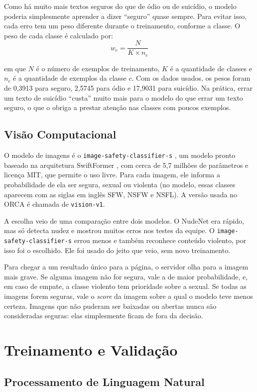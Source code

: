 \documentclass[
    12pt,           %
    oneside,        %
    a4paper,        %
    chapter=TITLE,  %
    english,        %
    brazil          %
]{abntex2}
\begin{document}
Como há muito mais textos seguros do que de ódio ou de suicídio, o modelo
poderia simplesmente aprender a dizer ``seguro'' quase sempre. Para evitar
isso, cada erro tem um peso diferente durante o treinamento, conforme a
classe. O peso de cada classe é calculado por:
\[
w_c = \frac{N}{K \times n_c}
\]

em que $N$ é o número de exemplos de treinamento, $K$ é a quantidade de
classes e $n_c$ é a quantidade de exemplos da classe $c$. Com os dados usados,
os pesos foram de 0,3913 para seguro, 2,5745 para ódio e 17,9031 para
suicídio. Na prática, errar um texto de suicídio ``custa'' muito mais para o
modelo do que errar um texto seguro, o que o obriga a prestar atenção nas
classes com poucos exemplos.
\subsection{Visão Computacional}

O modelo de imagens é o \texttt{image-safety-classifier-s}
\cite{imagesafety}, um modelo pronto baseado na arquitetura SwiftFormer
\cite{shaker2023}, com cerca de 5,7 milhões de parâmetros e licença MIT, que
permite o uso livre. Para cada imagem, ele informa a probabilidade de ela ser
segura, sexual ou violenta (no modelo, essas classes aparecem com as siglas em
inglês SFW, NSFW e NSFL). A versão usada no ORCA é chamada de
\texttt{vision-v1}.

A escolha veio de uma comparação entre dois modelos. O NudeNet era rápido,
mas só detecta nudez e mostrou muitos erros nos testes da equipe. O
\texttt{image-safety-classifier-s} errou menos e também reconhece conteúdo
violento, por isso foi o escolhido. Ele foi usado do jeito que veio, sem novo
treinamento.

Para chegar a um resultado único para a página, o servidor olha para a imagem
mais grave. Se alguma imagem não for segura, vale a de maior probabilidade, e,
em caso de empate, a classe violento tem prioridade sobre a sexual. Se todas
as imagens forem seguras, vale o \textit{score} da imagem sobre a qual o
modelo teve menos certeza. Imagens que não puderam ser baixadas ou abertas
nunca são consideradas seguras: elas simplesmente ficam de fora da decisão.
\section{Treinamento e Validação}

\subsection{Processamento de Linguagem Natural}
\end{document}
